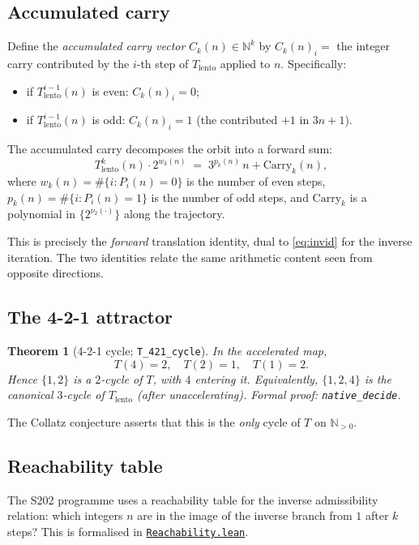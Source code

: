 \documentclass[11pt,a4paper]{article}
\theoremstyle{plain}
\newtheorem{theorem}{Theorem}[section]
\theoremstyle{definition}
\newcommand{\NN}{\mathbb{N}}
\begin{document}
\subsection{Accumulated carry}

Define the \emph{accumulated carry vector} $C_k(n) \in \NN^k$ by
$C_k(n)_i = $ the integer carry contributed by the $i$-th step of
$T_{\mathrm{lento}}$ applied to $n$. Specifically:
\begin{itemize}
  \item if $T_{\mathrm{lento}}^{i-1}(n)$ is even: $C_k(n)_i = 0$;
  \item if $T_{\mathrm{lento}}^{i-1}(n)$ is odd:
        $C_k(n)_i = 1$ (the contributed $+1$ in $3n + 1$).
\end{itemize}

The accumulated carry decomposes the orbit into a forward sum:
\[
   T_{\mathrm{lento}}^k(n) \cdot 2^{w_k(n)}
   \;=\; 3^{p_k(n)} \, n + \mathrm{Carry}_k(n),
\]
where $w_k(n) = \#\{i : P_i(n) = 0\}$ is the number of even
steps, $p_k(n) = \#\{i : P_i(n) = 1\}$ is the number of odd
steps, and $\mathrm{Carry}_k$ is a polynomial in $\{2^{\nu_2(\cdot)}\}$
along the trajectory.

This is precisely the \emph{forward} translation identity, dual to
\eqref{eq:invid} for the inverse iteration. The two identities
relate the same arithmetic content seen from opposite directions.

\subsection{The 4-2-1 attractor}

\begin{theorem}[4-2-1 cycle; \texttt{T\_421\_cycle}]
\label{thm:421}
In the accelerated map,
\[
   T(4) = 2, \quad T(2) = 1, \quad T(1) = 2.
\]
Hence $\{1, 2\}$ is a $2$-cycle of $T$, with $4$ entering it.
Equivalently, $\{1, 2, 4\}$ is the canonical $3$-cycle of
$T_{\mathrm{lento}}$ (after unaccelerating).
Formal proof: \texttt{native\_decide}.
\end{theorem}

The Collatz conjecture asserts that this is the \emph{only}
cycle of $T$ on $\NN_{> 0}$.

\subsection{Reachability table}

The S202 programme uses a reachability table for the inverse
admissibility relation: which integers $n$ are in the image of
the inverse branch from $1$ after $k$ steps? This is formalised
in
\href{run:CollatzLean4/CollatzLean4/Reachability.lean}%
{\texttt{Reachability.lean}}.
\end{document}
